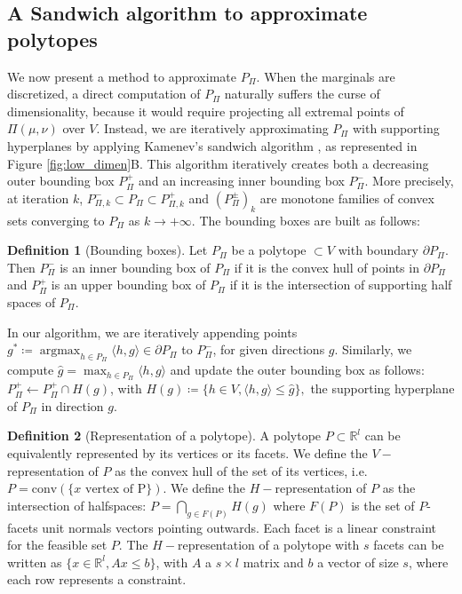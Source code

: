 \documentclass{article}
\newcommand{\R}{\mathbb{R}}
\newcommand{\1}{\mathbf{1}}
\DeclareMathOperator*{\argmax}{argmax}
\theoremstyle{definition}
\newtheorem{definition}{Definition}
\theoremstyle{remark}
\begin{document}
\subsection{A Sandwich algorithm to approximate polytopes}\label{sec:bounding_boxes}

We now present a method to approximate $P_\Pi$.  When the marginals are discretized, a direct computation of $P_\Pi$ naturally suffers the curse of dimensionality, because it would require projecting all extremal points of $\Pi(\mu,\nu)$ over $V$. Instead, we are iteratively approximating $P_\Pi$ with supporting hyperplanes by applying Kamenev's sandwich algorithm \cite{kamenev1996algorithm,lammel2023convergence}, as represented in Figure \ref{fig:low_dimen}B. This algorithm iteratively creates both a decreasing outer bounding box $P_{\Pi}^+$ and an increasing inner bounding box $P_{\Pi}^-$. More precisely, at iteration $k$, $P_{\Pi,k}^-\subset P_\Pi\subset P_{\Pi,k}^+$ and $(P_{\Pi}^\pm)_k$ are monotone families of convex sets converging to $P_\Pi$ as $k\to+\infty$. The bounding boxes are built as follows:
\begin{definition}[Bounding boxes]\label{def:bounding_box}
Let $P_\Pi$ be a polytope $\subset V$ with boundary $\partial P_\Pi$. Then $P_{\Pi}^-$ is an inner bounding box of $P_\Pi$ if it is the convex hull of points in $\partial P_\Pi$ and $P_{\Pi}^+$ is an upper bounding box of $P_\Pi$ if it is the intersection of supporting half spaces of $P_\Pi$.



\end{definition}
In our algorithm, we are iteratively appending points $g^*\coloneqq\argmax_{h\in P_\Pi} \langle h,g\rangle\in\partial P_\Pi$ to $P_{\Pi}^-$, for given directions $g$. Similarly, we compute $ \hat{g}=\max_{h\in P_\Pi}\langle h,g\rangle$ and update the outer bounding box as follows: $P_{\Pi}^+\gets P_{\Pi}^+\cap H(g)$, with $H(g) \coloneqq \{h\in V, \langle h,g\rangle\leq \hat{g}\},$ the supporting hyperplane of $P_\Pi$ in direction $g$.

\begin{definition}[Representation of a polytope]\label{def:polytope}
    A polytope $P\subset\R^l$ can be equivalently represented by its vertices or its facets. We define the $V-$representation of $P$ as the convex hull of the set of its vertices, i.e. $P=\mathrm{conv}(\{x \text{ vertex of P}\})$. We define the $H-$representation of $P$ as the intersection of halfspaces: $P=\bigcap_{g \in F(P)}H(g)$ where $F(P)$ is the set of $P$-facets unit normals vectors pointing outwards. Each facet is a linear constraint for the feasible set $P$. The $H-$representation of a polytope with $s$ facets can be written as $\{x\in \R^l, Ax\leq b\}$, with $A$ a $s\times l$ matrix and $b$ a vector of size $s$, where each row represents a constraint.
\end{definition}
\end{document}

